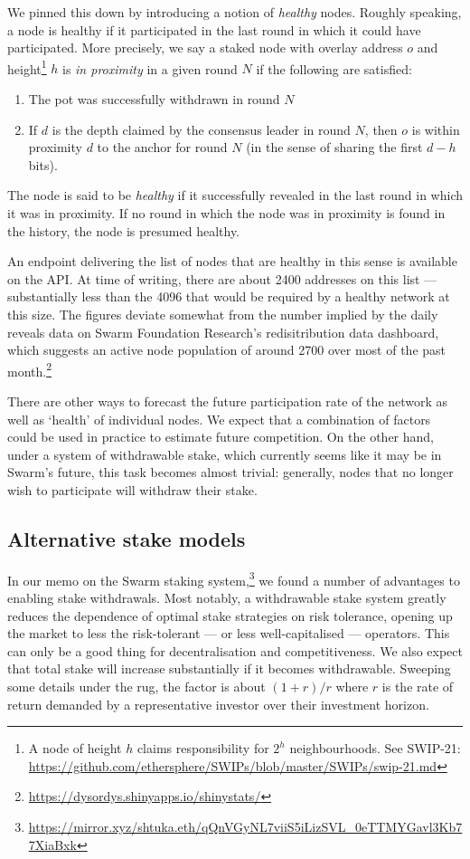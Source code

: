 We pinned this down by introducing a notion of \emph{healthy} nodes. Roughly speaking, a node is healthy if it participated in the last round in which it could have participated.
%
More precisely, we say a staked node with overlay address $o$ and height\footnote{A node of height $h$ claims responsibility for $2^h$ neighbourhoods. See SWIP-21: \url{https://github.com/ethersphere/SWIPs/blob/master/SWIPs/swip-21.md}} $h$ is \emph{in proximity} in a given round $N$ if the following are satisfied:
%
\begin{enumerate}
  \item The pot was successfully withdrawn in round $N$
  \item If $d$ is the depth claimed by the consensus leader in round $N$, then $o$ is within proximity $d$ to the anchor for round $N$ (in the sense of sharing the first $d-h$ bits).
\end{enumerate}
%
The node is said to be \emph{healthy} if it successfully revealed in the last round in which it was in proximity.
%
If no round in which the node was in proximity is found in the history, the node is presumed healthy.

An endpoint delivering the list of nodes that are healthy in this sense is available on the API.
%
At time of writing, there are about 2400 addresses on this list --- substantially less than the 4096 that would be required by a healthy network at this size.
%
The figures deviate somewhat from the number implied by the daily reveals data on Swarm Foundation Research's redisitribution data dashboard, which suggests an active node population of around 2700 over most of the past month.\footnote{\url{https://dysordys.shinyapps.io/shinystats/}}

There are other ways to forecast the future participation rate of the network as well as `health' of individual nodes.
%
We expect that a combination of factors could be used in practice to estimate future competition.
%
On the other hand, under a system of withdrawable stake, which currently seems like it may be in Swarm's future, this task becomes almost trivial: generally, nodes that no longer wish to participate will withdraw their stake.

\subsection*{Alternative stake models}

In our memo on the Swarm staking system,\footnote{\url{https://mirror.xyz/shtuka.eth/qQnVGyNL7viiS5iLizSVL_0eTTMYGavl3Kb77XiaBxk}} we found a number of advantages to enabling stake withdrawals.
%
Most notably, a withdrawable stake system greatly reduces the dependence of optimal stake strategies on risk tolerance, opening up the market to less the risk-tolerant --- or less well-capitalised --- operators.
%
This can only be a good thing for decentralisation and competitiveness.
%
We also expect that total stake will increase substantially if it becomes withdrawable.
%
Sweeping some details under the rug, the factor is about $(1+r)/r$ where $r$ is the rate of return demanded by a representative investor over their investment horizon.

